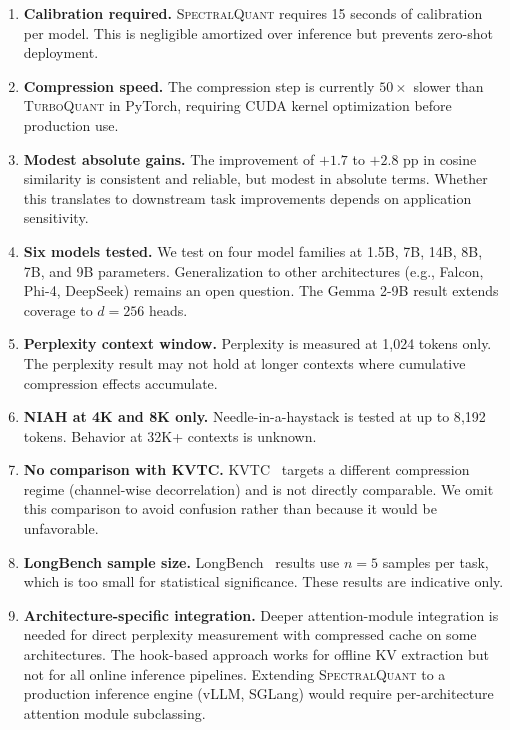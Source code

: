 \documentclass[11pt]{article}
\newcommand{\TQ}{\textsc{TurboQuant}}
\newcommand{\SQ}{\textsc{SpectralQuant}}
\begin{document}
\begin{enumerate}[leftmargin=2em]
\item \textbf{Calibration required.}  \SQ{} requires 15 seconds of calibration
per model.  This is negligible amortized over inference but prevents zero-shot
deployment.

\item \textbf{Compression speed.}  The compression step is currently $50\times$
slower than \TQ{} in PyTorch, requiring CUDA kernel optimization before
production use.

\item \textbf{Modest absolute gains.}  The improvement of $+1.7$ to $+2.8$
pp in cosine similarity is consistent and reliable, but modest in absolute terms.
Whether this translates to downstream task improvements depends on application
sensitivity.

\item \textbf{Six models tested.}  We test on four model families at 1.5B, 7B,
14B, 8B, 7B, and 9B parameters.  Generalization to other architectures
(e.g., Falcon, Phi-4, DeepSeek) remains an open question.  The Gemma 2-9B
result extends coverage to $d = 256$ heads.

\item \textbf{Perplexity context window.}  Perplexity is measured at 1{,}024
tokens only.  The perplexity result may not hold at longer contexts where
cumulative compression effects accumulate.

\item \textbf{NIAH at 4K and 8K only.}  Needle-in-a-haystack is tested at up
to 8{,}192 tokens.  Behavior at 32K+ contexts is unknown.

\item \textbf{No comparison with KVTC.}  KVTC~\citep{kvtc2025} targets a
different compression regime (channel-wise decorrelation) and is not directly
comparable.  We omit this comparison to avoid confusion rather than because it
would be unfavorable.

\item \textbf{LongBench sample size.}  LongBench~\citep{bai2023longbench} results use $n = 5$ samples
per task, which is too small for statistical significance.  These results are
indicative only.

\item \textbf{Architecture-specific integration.}  Deeper attention-module
integration is needed for direct perplexity measurement with compressed cache
on some architectures.  The hook-based approach works for offline KV extraction
but not for all online inference pipelines.  Extending \SQ{} to a production
inference engine (vLLM, SGLang) would require per-architecture attention module
subclassing.
\end{enumerate}
\end{document}
